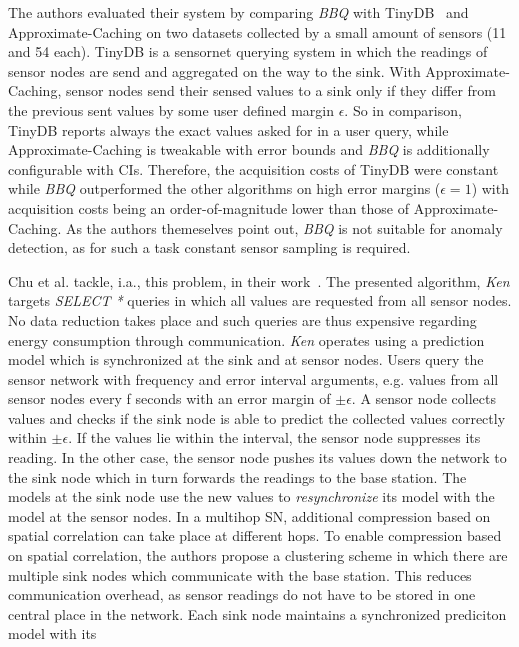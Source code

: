 The authors evaluated their system by comparing \textit{BBQ} with
TinyDB~\cite{madden2005tinydb} and Approximate-Caching on two datasets
collected by a small amount of sensors (11 and 54 each). TinyDB is a sensornet
querying system in which the readings of sensor nodes are send and aggregated
on the way to the sink. With Approximate-Caching, sensor nodes send their
sensed values to a sink only if they differ from the previous sent values by
some user defined margin $ \epsilon $. So in comparison, TinyDB reports always
the exact values asked for in a user query, while  Approximate-Caching is
tweakable with error bounds and \textit{BBQ} is additionally configurable with
\acp{CI}. Therefore, the acquisition costs of TinyDB were constant while
\textit{BBQ} outperformed the other algorithms on high error margins ($
\epsilon = 1 $) with acquisition costs being an order-of-magnitude lower than
those of Approximate-Caching. As the authors themeselves point out,
\textit{BBQ} is not suitable for anomaly detection, as for such a task constant
sensor sampling is required.
\par
Chu et al. tackle, i.a., this problem, in their work~\cite{chu2006approximate}.
The presented algorithm, \textit{Ken} targets \textit{SELECT *} queries in
which all values are requested from all sensor nodes. No data reduction takes
place and such queries are thus expensive regarding energy consumption through
communication. \textit{Ken} operates using a prediction model which is
synchronized at the sink and at sensor nodes. Users query the sensor network
with frequency and error interval arguments, e.g. values from all sensor nodes
every f seconds with an error margin of $ \pm\epsilon $. A sensor node collects
values and checks if the sink node is able to predict the collected values
correctly within $ \pm\epsilon $. If the values lie within the interval, the
sensor node suppresses its reading. In the other case, the sensor node pushes
its values down the network to the sink node which in turn forwards the
readings to the base station. The models at the sink node use the new values to
\textit{resynchronize} its model with the model at the sensor nodes. In a
multihop \ac{SN}, additional compression based on spatial correlation can take
place at different hops. To enable compression based on spatial correlation,
the authors propose a clustering scheme in which there are multiple sink nodes
which communicate with the base station. This reduces communication overhead,
as sensor readings do not have to be stored in one central place in the
network. Each sink node maintains a synchronized prediciton model with its
